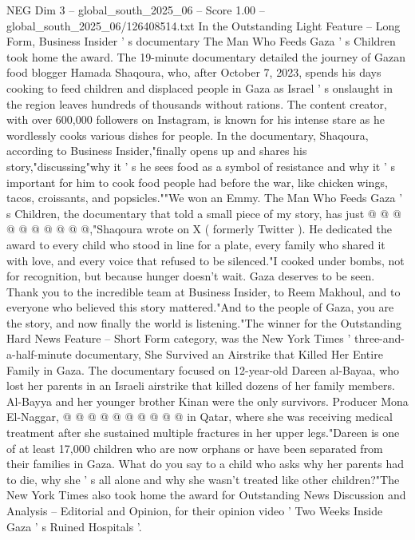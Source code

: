 \begin{textsample}{NEG Dim 3 – global\_south\_2025\_06 – Score 1.00 – global\_south\_2025\_06/126408514.txt}  \label{ex:f3_neg_256}
In the Outstanding Light Feature -- Long Form, Business Insider ' s documentary The Man Who Feeds Gaza ' s Children took home the award.
The 19-minute documentary detailed the journey of Gazan food blogger Hamada Shaqoura, who, after October 7, 2023, spends his days cooking to feed children and displaced people in Gaza as Israel ' s onslaught in the region leaves hundreds of thousands without rations.
The content creator, with over 600,000 followers on Instagram, is known for his intense stare as he wordlessly cooks various dishes for people.
In the documentary, Shaqoura, according to Business Insider,"finally opens up and shares his story,"discussing"why it ' s he sees food as a symbol of resistance and why it ' s important for him to cook food people had before the war, like chicken wings, tacos, croissants, and popsicles.""We won an Emmy.
The Man Who Feeds Gaza ' s Children, the documentary that told a small piece of my story, has just @ @ @ @ @ @ @ @ @ @,"Shaqoura wrote on X ( formerly Twitter ).
He dedicated the award to every child who stood in line for a plate, every family who shared it with love, and every voice that refused to be silenced."I cooked under bombs, not for recognition, but because hunger doesn't wait.
Gaza deserves to be seen.
Thank you to the incredible team at Business Insider, to Reem Makhoul, and to everyone who believed this story mattered."And to the people of Gaza, you are the story, and now finally the world is listening."The winner for the Outstanding Hard News Feature -- Short Form category, was the New York Times ' three-and-a-half-minute documentary, She Survived an Airstrike that Killed Her Entire Family in Gaza.
The documentary focused on 12-year-old Dareen al-Bayaa, who lost her parents in an Israeli airstrike that killed dozens of her family members.
Al-Bayya and her younger brother Kinan were the only survivors.
Producer Mona El-Naggar, @ @ @ @ @ @ @ @ @ @ in Qatar, where she was receiving medical treatment after she sustained multiple fractures in her upper legs."Dareen is one of at least 17,000 children who are now orphans or have been separated from their families in Gaza.
What do you say to a child who asks why her parents had to die, why she ' s all alone and why she wasn't treated like other children?"The New York Times also took home the award for Outstanding News Discussion and Analysis -- Editorial and Opinion, for their opinion video ' Two Weeks Inside Gaza ' s Ruined Hospitals '.

\end{textsample}

